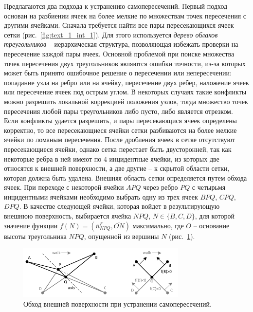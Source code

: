 \documentclass[a4paper,14pt]{extarticle}                     %
\theoremstyle{plain}                                         %
\begin{document}
Предлагаются два подхода к устранению самопересечений.
Первый подход основан на разбиении ячеек на более мелкие по множествам точек пересечения с другими ячейками.
Сначала требуется найти все пары пересекающихся ячеек сетки (рис.~\ref{fig:text_1_int_1}).
Для этого используется \textit{дерево облаков треугольников} -- иерархическая структура, позволяющая избежать проверки на пересечение каждой пары ячеек.
Основной проблемой при поиске множества точек пересечения двух треугольников являются ошибки точности, из-за которых может быть принято ошибочное решение о пересечении или непересечении: попадание узла на ребро или на ячейку, пересечение двух ребер, наложение ячеек или пересечение ячеек под острым углом.
В некоторых случаях такие конфликты можно разрешить локальной коррекцией положения узлов, тогда множество точек пересечения любой пары треугольников либо пусто, либо является отрезком.
Если конфликты удается разрешить, и пары пересекающися ячеек определены корректно, то все пересекающиеся ячейки сетки разбиваются на более мелкие ячейки по ломаным пересечения.
После дробления ячеек в сетке отсутствуют пересекающиеся ячейки, однако сетка перестает быть двусторонней, так как некоторые ребра в  ней имеют по 4 инцидентные ячейки, из которых две относятся к внешней поверхности, а две другие -- к скрытой области сетки, которая должна быть удалена.
Внешняя область сетки определяется путем обхода ячеек.
При переходе с некоторой ячейки $APQ$ через ребро $PQ$ с четырьмя инцидентными ячейками необходимо выбрать одну из трех ячеек $BPQ$, $CPQ$, $DPQ$.
В качестве следующей ячейки, которая войдет в результирующую внешнюю поверхность, выбирается ячейка $NPQ$, $N \in \{ B, C, D \}$, для которой значение функции $f(N) = (\overline{n}_{NPQ}^F, \overline{ON})$ максимально, где $O$ -- основание высоты треугольника $NPQ$, опущенной из вершины $N$ (рис.~\ref{fig:int_walk}).

\begin{figure}[!ht]
\centering
\includegraphics[width=0.75\textwidth]{./fig/int_walk.pdf}
\singlespacing
\caption{Обход внешней поверхности при устранении самопересечений.}
\label{fig:int_walk}
\end{figure}
\end{document}
